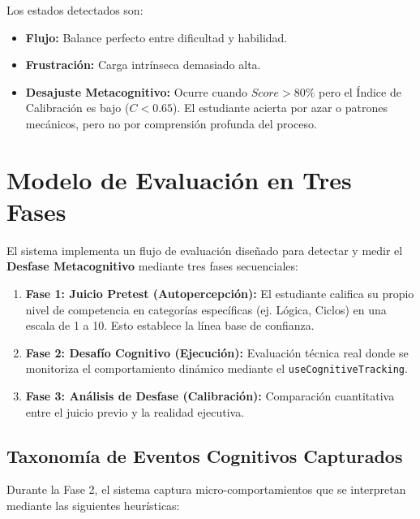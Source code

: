 \documentclass{article}
\begin{document}
Los estados detectados son:
\begin{itemize}
    \item \textbf{Flujo:} Balance perfecto entre dificultad y habilidad.
    \item \textbf{Frustración:} Carga intrínseca demasiado alta.
    \item \textbf{Desajuste Metacognitivo:} Ocurre cuando $Score > 80\%$ pero el Índice de Calibración es bajo ($C < 0.65$). El estudiante acierta por azar o patrones mecánicos, pero no por comprensión profunda del proceso.
\end{itemize}

\section{Modelo de Evaluación en Tres Fases}

El sistema implementa un flujo de evaluación diseñado para detectar y medir el \textbf{Desfase Metacognitivo} mediante tres fases secuenciales:

\begin{enumerate}
    \item \textbf{Fase 1: Juicio Pretest (Autopercepción):} El estudiante califica su propio nivel de competencia en categorías específicas (ej. Lógica, Ciclos) en una escala de 1 a 10. Esto establece la línea base de confianza.
    \item \textbf{Fase 2: Desafío Cognitivo (Ejecución):} Evaluación técnica real donde se monitoriza el comportamiento dinámico mediante el \texttt{useCognitiveTracking}.
    \item \textbf{Fase 3: Análisis de Desfase (Calibración):} Comparación cuantitativa entre el juicio previo y la realidad ejecutiva.
\end{enumerate}

\subsection{Taxonomía de Eventos Cognitivos Capturados}
Durante la Fase 2, el sistema captura micro-comportamientos que se interpretan mediante las siguientes heurísticas:
\end{document}
